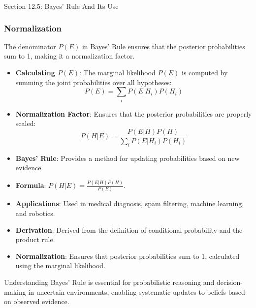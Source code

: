 \begin{notes}{Section 12.5: Bayes' Rule And Its Use}
\begin{highlight}
    \end{highlight}
    
    \subsubsection*{Normalization}
    
    The denominator $P(E)$ in Bayes' Rule ensures that the posterior probabilities sum to 1, making it a normalization factor.
    
    \begin{highlight}[Normalization]
    
        \begin{itemize}
            \item \textbf{Calculating $P(E)$}: The marginal likelihood $P(E)$ is computed by summing the joint probabilities over all hypotheses:
            \[
            P(E) = \sum_{i} P(E | H_i) P(H_i)
            \]
            \item \textbf{Normalization Factor}: Ensures that the posterior probabilities are properly scaled:
            \[
            P(H | E) = \frac{P(E | H) P(H)}{\sum_{i} P(E | H_i) P(H_i)}
            \]
        \end{itemize}
    
    \end{highlight}
    
    \begin{highlight}
    
        \begin{itemize}
            \item \textbf{Bayes' Rule}: Provides a method for updating probabilities based on new evidence.
            \item \textbf{Formula}: $P(H | E) = \frac{P(E | H) P(H)}{P(E)}$.
            \item \textbf{Applications}: Used in medical diagnosis, spam filtering, machine learning, and robotics.
            \item \textbf{Derivation}: Derived from the definition of conditional probability and the product rule.
            \item \textbf{Normalization}: Ensures that posterior probabilities sum to 1, calculated using the marginal likelihood.
        \end{itemize}
    
        Understanding Bayes' Rule is essential for probabilistic reasoning and decision-making in uncertain environments, enabling systematic updates to beliefs based on observed evidence.
    
    \end{highlight}
\end{notes}

